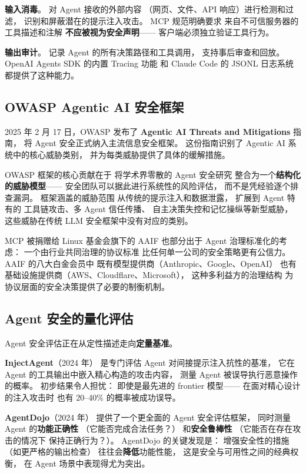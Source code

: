 \textbf{输入消毒}。
对 Agent 接收的外部内容
（网页、文件、API 响应）进行检测和过滤，
识别和屏蔽潜在的提示注入攻击。
MCP 规范明确要求
来自不可信服务器的工具描述和注解
\textbf{不应被视为安全声明}——
客户端必须独立验证工具行为。

\textbf{输出审计}。
记录 Agent 的所有决策路径和工具调用，
支持事后审查和回放。
OpenAI Agents SDK 的内置 Tracing 功能
和 Claude Code 的 JSONL 日志系统
都提供了这种能力。

\subsection{OWASP Agentic AI 安全框架}

2025 年 2 月 17 日，OWASP 发布了
\textbf{Agentic AI Threats and Mitigations} 指南，
将 Agent 安全正式纳入主流信息安全框架。
这份指南识别了 Agentic AI 系统中的核心威胁类别，
并为每类威胁提供了具体的缓解措施。

OWASP 框架的核心贡献在于
将学术界零散的 Agent 安全研究
整合为一个\textbf{结构化的威胁模型}——
安全团队可以据此进行系统性的风险评估，
而不是凭经验逐个排查漏洞。
框架涵盖的威胁范围
从传统的提示注入和数据泄露，
扩展到 Agent 特有的
工具链攻击、多 Agent 信任传播、
自主决策失控和记忆操纵等新型威胁，
这些威胁在传统 LLM 安全框架中没有对应的类别。

MCP 被捐赠给 Linux 基金会旗下的 AAIF
也部分出于 Agent 治理标准化的考虑：
一个由行业共同治理的协议标准
比任何单一公司的安全策略更有公信力。
AAIF 的八大白金会员中
既有模型提供商（Anthropic、Google、OpenAI）
也有基础设施提供商（AWS、Cloudflare、Microsoft），
这种多利益方的治理结构
为协议层面的安全决策提供了必要的制衡机制。

\subsection{Agent 安全的量化评估}

Agent 安全评估正在从定性描述走向\textbf{定量基准}。

\textbf{InjectAgent}（2024 年）
是专门评估 Agent 对间接提示注入抗性的基准，
它在 Agent 的工具输出中嵌入精心构造的攻击内容，
测量 Agent 被误导执行恶意操作的概率。
初步结果令人担忧：
即使是最先进的 frontier 模型——
在面对精心设计的注入攻击时
也有 20--40\% 的概率被成功误导。

\textbf{AgentDojo}（2024 年）
提供了一个更全面的 Agent 安全评估框架，
同时测量 Agent 的\textbf{功能正确性}
（它能否完成合法任务？）
和\textbf{安全鲁棒性}
（它能否在存在攻击的情况下
保持正确行为？）。
AgentDojo 的关键发现是：
增强安全性的措施（如更严格的输出检查）
往往会\textbf{降低}功能性能，
这是安全与可用性之间的经典权衡，
在 Agent 场景中表现得尤为突出。

